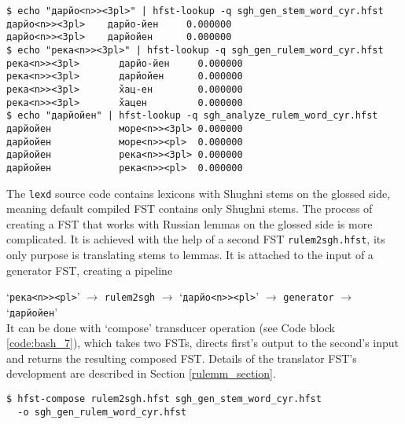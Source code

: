 \begin{code_frame}[float]
    \begin{footnotesize}\codespacing
    \begin{verbatim}
$ echo "дарйо<n>><3pl>" | hfst-lookup -q sgh_gen_stem_word_cyr.hfst
дарйо<n>><3pl>	  дарйо-йен     0.000000
дарйо<n>><3pl>	  дарйойен      0.000000
$ echo "река<n>><3pl>" | hfst-lookup -q sgh_gen_rulem_word_cyr.hfst
река<n>><3pl>	    дарйо-йен     0.000000
река<n>><3pl>	    дарйойен      0.000000
река<n>><3pl>	    х̌ац-ен        0.000000
река<n>><3pl>	    х̌ацен         0.000000
$ echo "дарйойен" | hfst-lookup -q sgh_analyze_rulem_word_cyr.hfst
дарйойен	        море<n>><3pl> 0.000000
дарйойен	        море<n>><pl>  0.000000
дарйойен	        река<n>><3pl> 0.000000
дарйойен	        река<n>><pl>  0.000000
    \end{verbatim}
    \end{footnotesize}
    \tcblower
    \label{code:pipeline_3}
\end{code_frame}

The \texttt{lexd} source code contains lexicons with Shughni stems on the glossed side, meaning default compiled FST contains only Shughni stems. The process of creating a FST that works with Russian lemmas on the glossed side is more complicated. It is achieved with the help of a second FST \texttt{rulem2sgh.hfst}, its only purpose is translating stems to lemmas. It is attached to the input of a generator FST, creating a pipeline 

\vspace*{0.3cm}
\noindent `\texttt{река<n>><pl>}' $\rightarrow$ \texttt{rulem2sgh} $\rightarrow$ `\texttt{дарйо<n>><pl>}' $\rightarrow$ \texttt{generator} $\rightarrow$ `\texttt{дарйойен}'\\


It can be done with `compose' transducer operation (see Code block \ref{code:bash_7}), which takes two FSTs, directs first's output to the second's input and returns the resulting composed FST. Details of the translator FST's development are described in Section \ref{rulemm_section}.

\begin{code_frame}[float]
    \begin{footnotesize}\codespacing
    \begin{verbatim}
$ hfst-compose rulem2sgh.hfst sgh_gen_stem_word_cyr.hfst
  -o sgh_gen_rulem_word_cyr.hfst
    \end{verbatim}
    \end{footnotesize}
    \tcblower
    \label{code:bash_7}
\end{code_frame}

